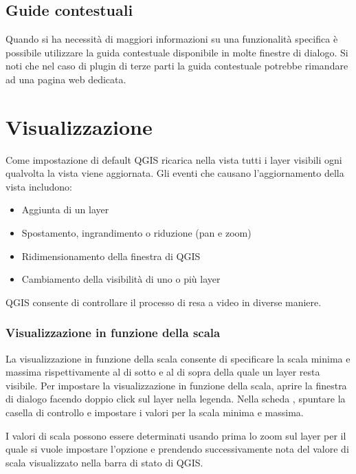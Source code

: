 \subsection{Guide contestuali}\label{context_help}

Quando si ha necessità di maggiori informazioni su una funzionalità specifica è possibile utilizzare la guida contestuale disponibile in molte finestre di dialogo. Si noti che nel caso di plugin di terze parti la guida contestuale potrebbe rimandare ad una pagina web dedicata.

\section{Visualizzazione}\label{subsec:redraw_events}

Come impostazione di default QGIS ricarica nella vista tutti i layer visibili
ogni qualvolta la vista viene aggiornata. Gli eventi che causano
l'aggiornamento della vista includono:

\begin{itemize}
\item Aggiunta di un layer
\item Spostamento, ingrandimento o riduzione (pan e zoom)
\item Ridimensionamento della finestra di QGIS
\item Cambiamento della visibilità di uno o più layer
\end{itemize}

QGIS consente di controllare il processo di resa a video in diverse maniere.

\subsubsection{Visualizzazione in funzione della scala}
\label{label_scaledepend}

La visualizzazione in funzione della scala consente di specificare la scala
minima e massima rispettivamente al di sotto e al di sopra della quale un
layer resta visibile. Per impostare la visualizzazione in funzione della scala,
aprire la finestra di dialogo  facendo doppio click sul
layer nella legenda. Nella scheda , spuntare la casella di
controllo  e impostare i valori per la scala minima e massima.

I valori di scala possono essere determinati usando prima lo zoom sul layer per
il quale si vuole impostare l'opzione e prendendo successivamente nota del valore di scala
visualizzato nella barra di stato di QGIS.

